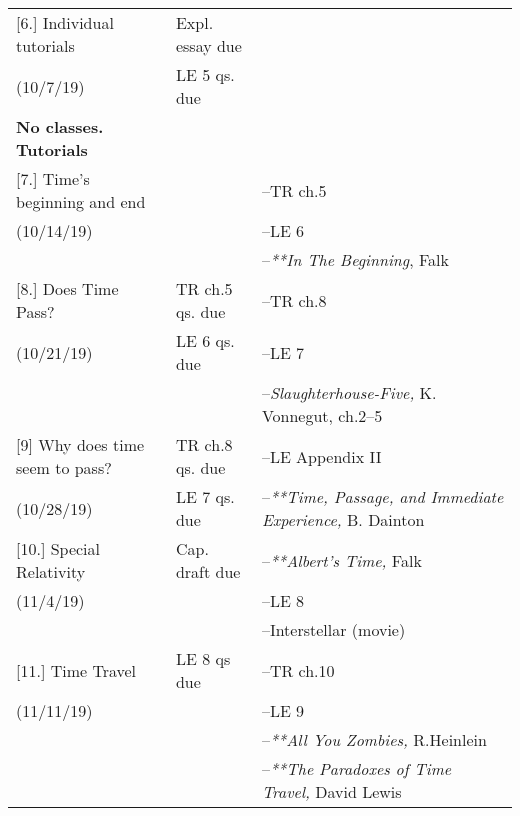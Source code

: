\documentclass[article,oneside]{memoir}
\begin{document}
\begin{center}
\begin{longtable}{p{4.5cm}p{2.5cm}p{5cm}}
[6.] Individual tutorials  	& Expl. essay due	& \\
(10/7/19)			      	& LE 5 qs. due				&  \\ 
\textbf{No classes. Tutorials} &  & \\  [1.8\baselineskip]

[7.] Time's beginning and end	 &   	&--TR ch.5  \\
(10/14/19)				        	&	&  --LE 6\\ 
		        	&	&  --\emph{**In The Beginning}, Falk\\ [1.8\baselineskip]


[8.] Does Time Pass?		& TR ch.5 qs. due		& --TR ch.8  \\ 
(10/21/19)			        		& LE 6 qs. due		    	  	& --LE 7 \\  
		        				&			& --\emph{Slaughterhouse-Five,} K. Vonnegut, ch.2--5   \\  [1.8\baselineskip] 



[9]   	Why does time seem to pass? & TR ch.8 qs. due	   		&  --LE Appendix II\\
(10/28/19)				          &  LE 7 qs. due			& --\emph{**Time, Passage, and Immediate Experience,} B. Dainton \\ [1.8\baselineskip]

[10.] Special Relativity 		& Cap. draft due		& --\emph{**Albert's Time,} Falk \\
(11/4/19)				      	& 					 & --LE 8  \\  
					      	& 					 & --Interstellar (movie)  \\  [1.8\baselineskip]


[11.] Time Travel			& LE 8 qs due		& --TR ch.10  \\
(11/11/19)		            		&		      & --LE 9  \\ 
						&			& --\emph{**All You Zombies,} R.Heinlein \\ 
						&			& --\emph{**The Paradoxes of Time Travel,} David Lewis \\  [1.8\baselineskip]


\end{longtable}
\end{center}
\end{document}
